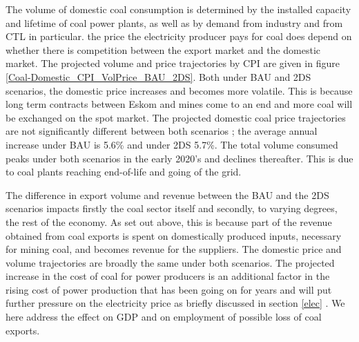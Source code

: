 \documentclass[12pt,english]{article}
\begin{document}
The volume of domestic coal consumption is determined by the installed capacity and lifetime of coal power plants, as well as by demand from industry and from CTL in particular.  the price the electricity producer pays for coal does depend on whether there is competition between the export market and the domestic market.  
The projected volume and price trajectories by CPI are given in figure \ref{Coal-Domestic_CPI_VolPrice_BAU_2DS}. Both under BAU and 2DS scenarios, the domestic price increases and becomes more volatile. This is because long term contracts between Eskom and mines come to an end and more coal will be exchanged on the spot market. The projected domestic coal price trajectories are not significantly different between both scenarios ; the average annual increase under BAU is 5.6\% and under 2DS 5.7\%. The total volume consumed peaks under both scenarios in the early 2020's and declines thereafter. This is due to coal plants reaching end-of-life and going of the grid.

The difference in export volume and revenue between the BAU and the 2DS scenarios impacts firstly the coal sector itself and secondly, to varying degrees, the rest of the economy. As set out above, this is because part of the revenue obtained from coal exports is spent on domestically produced inputs, necessary for mining coal, and becomes revenue for the suppliers. The domestic price and volume trajectories are broadly the same under both scenarios. %
The projected increase in the cost of coal for power producers is an additional factor in the rising cost of power production that has been going on for years and will put further pressure on the electricity price as briefly discussed in section \ref{elec} \citep{}. We here address the effect on GDP and on employment of possible loss of coal exports.
\end{document}
